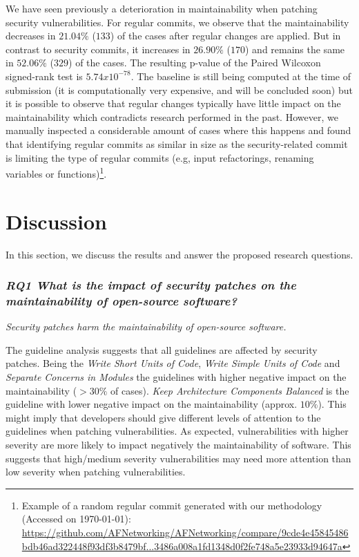 \documentclass[10pt,conference]{IEEEtran}
\begin{document}
We have seen previously a deterioration in maintainability when patching security vulnerabilities. 
For regular commits, we observe that the maintainability decreases in $21.04\%$ ($133$) 
of the cases after regular changes are applied. But in contrast
to security commits, it increases in $26.90\%$ ($170$) 
and remains the same in $52.06\%$ ($329$) 
of the cases. The resulting p-value of the Paired Wilcoxon signed-rank
test is $5.74x10^{-78}$. The baseline is still being computed at the time of submission (it is computationally very expensive, and will be concluded soon) but it is possible to observe 
that regular changes typically have little impact on the maintainability which contradicts research performed in the past. However,
we manually inspected a considerable amount of cases where this happens and
found that identifying regular commits as similar in size as the security-related commit is limiting the type of regular commits (e.g, input refactorings, renaming variables or functions)\footnote{Example of a random regular commit generated with our methodology (Accessed on \today{}):
\url{https://github.com/AFNetworking/AFNetworking/compare/9cde4e45845486bdb46ad322448f93df3b8479bf...3486a008a1fd1348d0f2fe748a5e23933d94647a}}.




\section{Discussion}\label{sec:discussion}

In this section, we discuss the results and answer the proposed research questions.

\subsubsection*{\textit{\textbf{RQ1} \textbf{What is the impact of security patches on the maintainability
of open-source software?}}}


\textit{Security patches harm the maintainability of open-source software.}

The guideline analysis suggests that all guidelines are affected by security patches. Being the
\emph{Write Short Units of Code}, \emph{Write Simple Units of Code} and \emph{Separate Concerns in Modules} the guidelines with higher negative impact on the maintainability ($>30\%$ of cases). \emph{Keep Architecture Components Balanced} is the guideline with lower negative impact on 
the maintainability (approx. $10\%$). This might imply that developers should give different
levels of attention to the guidelines when patching vulnerabilities.
%
As expected, vulnerabilities with higher severity are more likely to impact negatively
the maintainability of software. This suggests that high/medium severity vulnerabilities may
need more attention than low severity when patching vulnerabilities.
%
\end{document}
